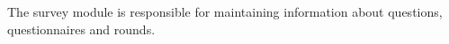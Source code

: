 The survey module is responsible for maintaining information about questions, questionnaires and rounds.